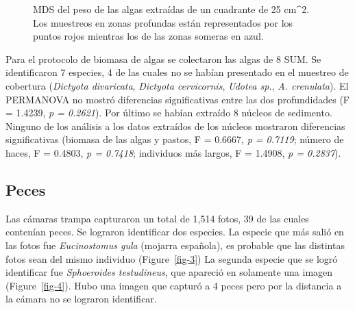 \documentclass[
  authoryear,
  preprint,
  3p,
  twocolumn]{elsarticle}
\begin{document}
\begin{figure}


\caption{\label{fig-2}MDS del peso de las algas extraídas de un
cuadrante de 25 cm\^{}2. Los muestreos en zonas profundas están
representados por los puntos rojos mientras los de las zonas someras en
azul.}

\end{figure}%

Para el protocolo de biomasa de algas se colectaron las algas de 8 SUM.
Se identificaron 7 especies, 4 de las cuales no se habían presentado en
el muestreo de cobertura (\emph{Dictyota divaricata}, \emph{Dictyota
cervicornis}, \emph{Udotea sp.}, \emph{A. crenulata}). El PERMANOVA no
mostró diferencias significativas entre las dos profundidades (F =
1.4239, \emph{p = 0.2621}). Por último se habían extraído 8 núcleos de
sedimento. Ninguno de los análisis a los datos extraídos de los núcleos
mostraron diferencias significativas (biomasa de las algas y pastos, F =
0.6667, \emph{p = 0.7119}; número de haces, F = 0.4803, \emph{p =
0.7418}; individuos más largos, F = 1.4908, \emph{p = 0.2837}).

\subsection{Peces}\label{peces-1}

Las cámaras trampa capturaron un total de 1,514 fotos, 39 de las cuales
contenían peces. Se lograron identificar dos especies. La especie que
más salió en las fotos fue \emph{Eucinostomus gula} (mojarra española),
es probable que las distintas fotos sean del mismo individuo
(Figure~\ref{fig-3}) La segunda especie que se logró identificar fue
\emph{Sphoeroides testudineus}, que apareció en solamente una imagen
(Figure~\ref{fig-4}). Hubo una imagen que capturó a 4 peces pero por la
distancia a la cámara no se lograron identificar.
\end{document}
